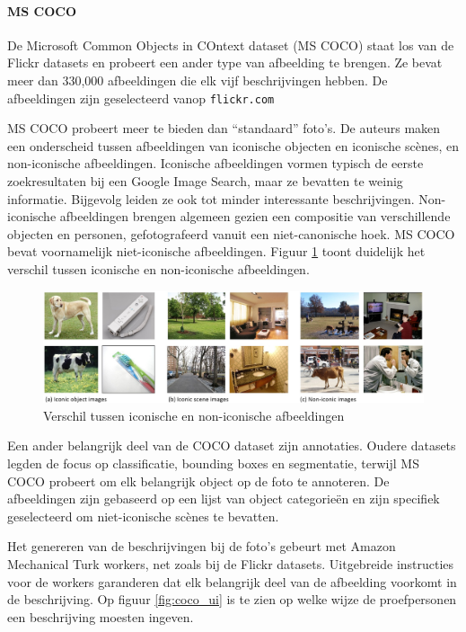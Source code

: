 \paragraph{MS COCO}
\label{par:MS COCO}
De Microsoft Common Objects in COntext dataset (MS COCO) \cite{Lin2014} staat los van de Flickr datasets en probeert een ander type van afbeelding te brengen. Ze bevat meer dan 330,000 afbeeldingen die elk vijf beschrijvingen hebben. De afbeeldingen zijn geselecteerd vanop \texttt{flickr.com}

MS COCO probeert meer te bieden dan ``standaard'' foto's. De auteurs maken een onderscheid tussen afbeeldingen van iconische objecten en iconische sc\`enes, en non-iconische afbeeldingen. Iconische afbeeldingen vormen typisch de eerste zoekresultaten bij een Google Image Search, maar ze bevatten te weinig informatie. Bijgevolg leiden ze ook tot minder interessante beschrijvingen. Non-iconische afbeeldingen brengen algemeen gezien een compositie van verschillende objecten en personen, gefotografeerd vanuit een niet-canonische hoek. MS COCO bevat voornamelijk niet-iconische afbeeldingen. Figuur \ref{fig:cocotypes} toont duidelijk het verschil tussen iconische en non-iconische afbeeldingen.

\begin{figure}[tb]
    \centering
    \includegraphics[width=\linewidth]{Images/iconic.jpg}
    \caption{Verschil tussen iconische en non-iconische afbeeldingen}
    \label{fig:cocotypes}
\end{figure}

Een ander belangrijk deel van de COCO dataset zijn annotaties. Oudere datasets legden de focus op classificatie, bounding boxes en segmentatie, terwijl MS COCO probeert om elk belangrijk object op de foto te annoteren. De afbeeldingen zijn gebaseerd op een lijst van object categorie\"en en zijn specifiek geselecteerd om niet-iconische sc\`enes te bevatten.

Het genereren van de beschrijvingen bij de foto's gebeurt met Amazon Mechanical Turk workers, net zoals bij de Flickr datasets. Uitgebreide instructies voor de workers garanderen dat elk belangrijk deel van de afbeelding voorkomt in de beschrijving. \cite{Rampf2015} Op figuur \ref{fig:coco_ui} is te zien op welke wijze de proefpersonen een beschrijving moesten ingeven.


